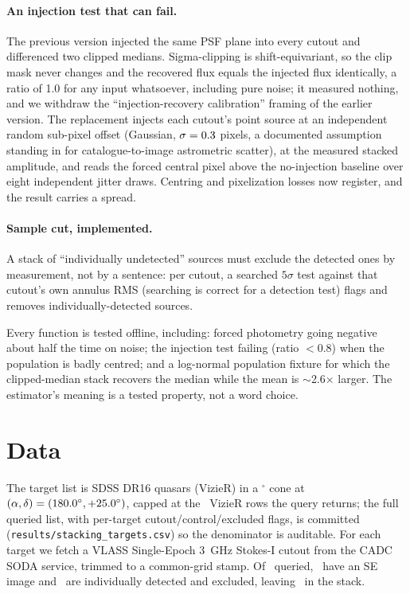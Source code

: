 \documentclass[twocolumn]{aastex631}
\newcommand{\code}[1]{\texttt{#1}}
\begin{document}
\paragraph{An injection test that can fail.} The previous version injected the same PSF plane into
every cutout and differenced two clipped medians. Sigma-clipping is shift-equivariant, so the clip
mask never changes and the recovered flux equals the injected flux identically, a ratio of
1.0 for any input whatsoever, including pure noise; it measured nothing, and we withdraw the
``injection-recovery calibration'' framing of the earlier version. The replacement injects each
cutout's point source at an independent random sub-pixel offset (Gaussian, $\sigma=0.3$
pixels, a documented assumption standing in for catalogue-to-image astrometric scatter), at the
measured stacked amplitude, and reads the forced central pixel above the no-injection
baseline over eight independent jitter draws. Centring and pixelization losses now register, and the
result carries a spread.

\paragraph{Sample cut, implemented.} A stack of ``individually undetected'' sources must exclude the
detected ones by measurement, not by a sentence: per cutout, a searched $5\sigma$ test against that
cutout's own annulus RMS (searching is correct for a detection test) flags and removes
individually-detected sources.

Every function is tested offline, including: forced photometry going negative about half the time
on noise; the injection test failing (ratio $<0.8$) when the population is badly centred; and a
log-normal population fixture for which the clipped-median stack recovers the median while
the mean is $\sim$2.6$\times$ larger. The estimator's meaning is a tested property, not a word
choice.

\section{Data}
The target list is SDSS DR16 quasars \citep{lyke2020} (VizieR) in a \stRadius$^\circ$ cone at
$(\alpha,\delta)=(180.0^\circ,+25.0^\circ)$, capped at the \stMaxSources\ VizieR rows
the query returns; the full queried list, with per-target cutout/control/excluded flags, is
committed (\code{results/stacking\_targets.csv}) so the denominator is auditable. For each target we
fetch a VLASS Single-Epoch \citep{lacy2020,gordon2021} 3~GHz Stokes-I cutout from the CADC SODA
service, trimmed to a common-grid stamp. Of \stNqueried\ queried, \stNwithCutout\ have an SE image
and \stNdetExcl\ are individually detected and excluded, leaving \stN\ in the stack.
\end{document}
